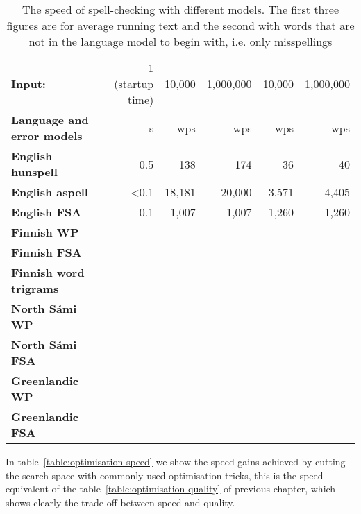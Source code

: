 \documentclass[a4paper,12pt]{article}
\begin{document}
\begin{table}
    \centering
    \begin{tabular}{|l|r||r|r|r|r|}
        \hline
        \bf Input: & 1 (startup time) & 10,000 & 1,000,000 & 10,000 & 1,000,000 \\
        \bf Language and error models & s & wps & wps & wps & wps \\
        \hline
        \bf English hunspell & 0.5 & 138 & 174 & 36 & 40 \\
          \bf English aspell & <0.1 & 18,181 & 20,000 & 3,571 & 4,405 \\

          \bf English FSA & 0.1 & 1,007 & 1,007 & 1,260 & 1,260 \\
        \hline
        \bf Finnish WP & & & & & \\
       \bf Finnish FSA & & & & & \\
        \bf Finnish word trigrams & & & & & \\
        \hline
        \bf North Sámi WP  & & & & & \\
        \bf North Sámi FSA & & & & & \\
        \hline
        \bf Greenlandic WP & & & & & \\
       \bf Greenlandic FSA & & & & & \\
        \hline
    \end{tabular}
    \caption{The speed of spell-checking with different models. The first three
    figures are for average running text and the second with words that are not
    in the language model to begin with, i.e. only
    misspellings\label{table:language-speed}}
\end{table}

In table~\ref{table:optimisation-speed} we show the speed gains achieved by
cutting the search space with commonly used optimisation tricks, this is the
speed-equivalent of the table~\ref{table:optimisation-quality} of previous
chapter, which shows clearly the trade-off between speed and quality.
\end{document}
